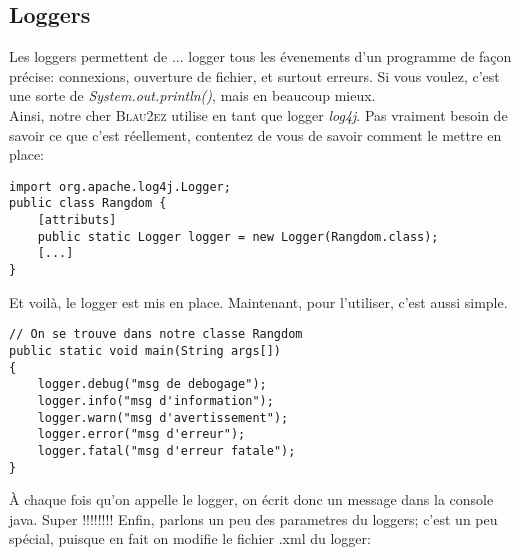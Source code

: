 \documentclass{article}
\begin{document}
\subsection{Loggers}
Les loggers permettent de ... logger tous les évenements d'un programme de façon précise: connexions, ouverture de fichier, et surtout erreurs. Si vous voulez, c'est une sorte de \emph{System.out.println()}, mais en beaucoup mieux.\\
Ainsi, notre cher \textsc{Blau2ez} utilise en tant que logger \emph{log4j}. Pas vraiment besoin de savoir ce que c'est réellement, contentez de vous de savoir comment le mettre en place:
\begin{lstlisting}
import org.apache.log4j.Logger;
public class Rangdom {
	[attributs]
	public static Logger logger = new Logger(Rangdom.class);
	[...]
}
\end{lstlisting}
Et voilà, le logger est mis en place. Maintenant, pour l'utiliser, c'est aussi simple.
\begin{lstlisting}
// On se trouve dans notre classe Rangdom
public static void main(String args[])
{
	logger.debug("msg de debogage");
	logger.info("msg d'information");
	logger.warn("msg d'avertissement");
	logger.error("msg d'erreur");
	logger.fatal("msg d'erreur fatale");   
}
\end{lstlisting}
À chaque fois qu'on appelle le logger, on écrit donc un message dans la console java. Super !!!!!!!!	
Enfin, parlons un peu des parametres du loggers; c'est un peu spécial, puisque en fait on modifie le fichier .xml du logger:
\end{document}

